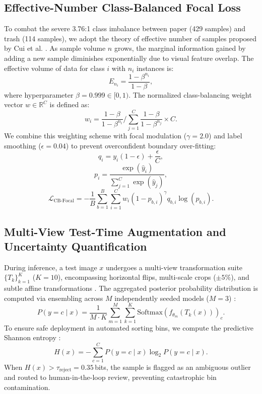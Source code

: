 \documentclass[11pt,a4paper]{article}
\begin{document}
\subsection{Effective-Number Class-Balanced Focal Loss}
To combat the severe 3.76:1 class imbalance between paper (429 samples) and trash (114 samples), we adopt the theory of effective number of samples proposed by Cui et al. \cite{cui2019}. As sample volume $n$ grows, the marginal information gained by adding a new sample diminishes exponentially due to visual feature overlap. The effective volume of data for class $i$ with $n_i$ instances is:
\begin{equation}
  E_{n_i} = \frac{1 - \beta^{n_i}}{1 - \beta},
\end{equation}
where hyperparameter $\beta = 0.999 \in [0, 1)$. The normalized class-balancing weight vector $w \in \mathbb{R}^C$ is defined as:
\begin{equation}
  w_i = \frac{1 - \beta}{1 - \beta^{n_i}} \Bigg/ \sum_{j=1}^C \frac{1 - \beta}{1 - \beta^{n_j}} \times C.
\end{equation}
We combine this weighting scheme with focal modulation ($\gamma = 2.0$) \cite{lin2017} and label smoothing ($\epsilon = 0.04$) \cite{szegedy2016} to prevent overconfident boundary over-fitting:
\begin{equation}
  q_i = y_i (1 - \epsilon) + \frac{\epsilon}{C},
\end{equation}
\begin{equation}
  p_i = \frac{\exp(\hat{y}_i)}{\sum_{j=1}^C \exp(\hat{y}_j)},
\end{equation}
\begin{equation}
  \mathcal{L}_{\text{CB-Focal}} = - \frac{1}{B} \sum_{b=1}^B \sum_{i=1}^C w_i (1 - p_{b, i})^\gamma q_{b, i} \log(p_{b, i}).
\end{equation}

\subsection{Multi-View Test-Time Augmentation and Uncertainty Quantification}
During inference, a test image $x$ undergoes a multi-view transformation suite $\{T_k\}_{k=1}^K$ ($K=10$), encompassing horizontal flips, multi-scale crops ($\pm 5\%$), and subtle affine transformations \cite{shorten2019}. The aggregated posterior probability distribution is computed via ensembling across $M$ independently seeded models ($M=3$) \cite{lakshminarayanan2017, guo2017}:
\begin{equation}
  P(y = c \mid x) = \frac{1}{M \cdot K} \sum_{m=1}^M \sum_{k=1}^K \mathrm{Softmax}\left(f_{\theta_m}(T_k(x))\right)_c.
\end{equation}
To ensure safe deployment in automated sorting bins, we compute the predictive Shannon entropy \cite{shannon1948}:
\begin{equation}
  H(x) = - \sum_{c=1}^C P(y=c \mid x) \log_2 P(y=c \mid x).
\end{equation}
When $H(x) > \tau_{\text{reject}} = 0.35$\,bits, the sample is flagged as an ambiguous outlier and routed to human-in-the-loop review, preventing catastrophic bin contamination.
\end{document}

